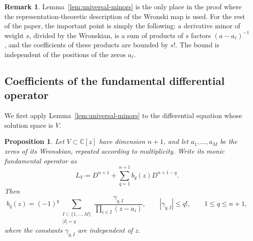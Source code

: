 \documentclass[12pt,letterpaper,reqno]{amsart}
\newtheorem{prop}[thm]{Proposition}
\theoremstyle{definition}
\newtheorem{rem}[thm]{Remark}
\numberwithin{equation}{section}
\newcommand{\C}{\mathbb C}
\begin{document}
\begin{rem}\label{rem:universal-minors-use}
Lemma~\ref{lem:universal-minors} is the only place in the proof where
the representation-theoretic description of the Wronski map is used.
For the rest of the paper, the important point is simply the following:
a derivative minor of weight \(s\), divided by the Wronskian, is a sum
of products of \(s\) factors \((a-a_\ell)^{-1}\), and the coefficients
of these products are bounded by \(s!\). The bound is independent of
the positions of the zeros \(a_\ell\).
\end{rem}


\subsection{Coefficients of the fundamental differential operator}
\label{sec:polynomial-coefficients}

We first apply Lemma~\ref{lem:universal-minors} to the differential
equation whose solution space is \(V\).

\begin{prop}\label{prop:polynomialcoeff}
Let \(V\subset\C[z]\) have dimension \({n+1}\), and let
\(a_1,\ldots,a_M\) be the zeros of its Wronskian, repeated according
to multiplicity. Write its monic fundamental operator as
\[
L_V
=
D^{n+1}+\sum_{q=1}^{n+1} b_q(z)D^{n+1-q}.
\]
Then
\begin{equation}\label{eq:productformula}
 b_q(z)
 =
 (-1)^q
 \sum_{\substack{I\subset\{1,\ldots,M\}\\|I|=q}}
 \frac{\gamma_{q,I}}
      {\prod_{i\in I}(z-a_i)},
 \qquad
 |\gamma_{q,I}|\leq q!,
 \qquad
 1\leq q\leq n+1,
\end{equation}
where the constants \(\gamma_{q,I}\) are independent of \(z\).
\end{prop}
\end{document}
